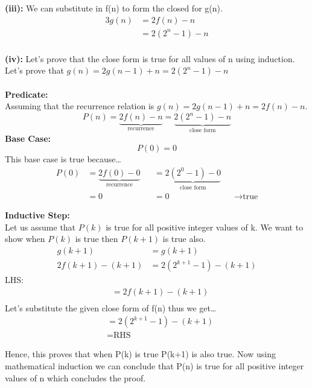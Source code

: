 \textbf{(iii):} 
We can substitute in f(n) to form the closed for g(n).
\begin{alignat*}{3}
    g(n) &= 2f(n)-n \\
         &= 2(2^n - 1)-n \\  
\end{alignat*}

\pagebreak

\textbf{(iv):} 
Let's prove that the close form is true for all values of n using induction. Let's prove that $g(n) = 2g(n - 1) + n = 2(2^n - 1)-n $
\\\\
\textbf{Predicate:}\\
Assuming that the recurrence relation is $g(n) = 2g(n - 1) + n  = 2f(n) - n$.
\[
  P(n) = \underbrace{2f(n)- n}_{\text{recurrence}}  = \underbrace{2(2^n - 1)-n}_{\text{close form}}
\]
\textbf{Base Case:} 
\[
  P(0) = 0
\]
This base case is true because\dots
\begin{align*}
    P(0) &= \underbrace{2f(0)- 0}_{\text{recurrence}} &&= \underbrace{2(2^0 - 1)-0}_{\text{close form}}\\
         &= 0 &&= 0 &&\rightarrow \text{true}
\end{align*}

\textbf{Inductive Step:}\\ 
Let us assume that $P(k)$ is true for all positive integer values of k. We want to show when $P(k)$ is true then $P(k+1)$ is true also.
\begin{align*}
 g(k+1) &= g(k+1)\\
 2f(k+1) - (k+1) &= 2(2^{k+1}-1) - (k + 1)
\end{align*}
LHS:
\begin{align*}
    &= 2f(k+1) - (k+1)\\
\end{align*}
Let's substitute the given close form of f(n) thus we get\dots
\begin{align*}
    &= 2(2^{k+1}-1) - (k+1)\\
    &=\text{RHS}
\end{align*}
    
Hence, this proves that when P(k) is true P(k+1) is also true. Now using mathematical induction we can conclude that P(n) is true for all positive integer values of n which concludes the proof.   